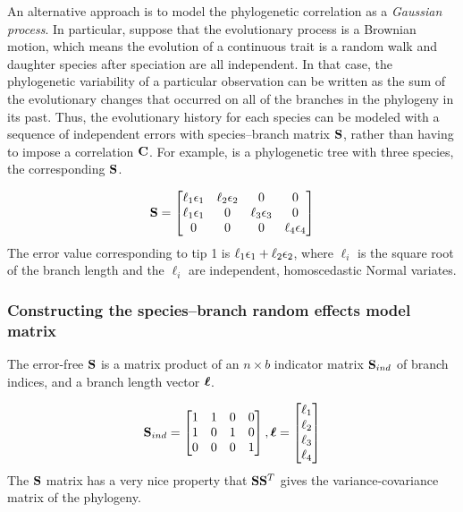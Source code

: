 An alternative approach is to model the phylogenetic correlation as a \textit{Gaussian process}. 
In particular, suppose that the evolutionary process is a Brownian motion, which means the evolution of a continuous trait is a random walk and daughter species after speciation are all independent.  
In that case, the phylogenetic variability of a particular observation can be written as the sum of the evolutionary changes that occurred on all of the branches in the phylogeny in its past. 
Thus, the evolutionary history for each species can be modeled with a sequence of independent errors with species--branch matrix ${\mathbf S}$, rather than having to impose a correlation ${\mathbf C}$.
For example,  is a phylogenetic tree with three species, the corresponding ${\mathbf S}$.

\begin{align*}
{\mathbf S} = \begin{bmatrix}
\ell_1 { \epsilon}_1 & \ell_2 { \epsilon}_2 & 0 & 0 \\
\ell_1 { \epsilon}_1 &  0 & \ell_3 { \epsilon}_3 & 0 \\
0  &  0 & 0  & \ell_4 { \epsilon}_4
\end{bmatrix}
\end{align*}
The error value corresponding to tip 1 is $\ell_1 { \epsilon}_1 + \ell_2 { \epsilon}_2$, where $\ell_i$ is the square root of the branch length and the $\ell_i$ are independent, homoscedastic Normal variates. 


\subsubsection*{Constructing the species--branch random effects model matrix}

The error-free ${\mathbf S}$ is a matrix product of an $n \times b$ indicator matrix ${\mathbf S}_{ind}$ of branch indices, and a branch length vector ${\boldsymbol \ell}$.

\begin{align*}
{\mathbf S}_{ind} = \begin{bmatrix}
1 & 1 & 0 & 0 \\ 
1 & 0 & 1 & 0 \\ 
0 & 0 & 0 & 1
\end{bmatrix} , 
{\boldsymbol \ell} = \begin{bmatrix}
\ell_1 \\
\ell_2 \\
\ell_3 \\
\ell_4 
\end{bmatrix}
\end{align*}
The ${\mathbf S}$ matrix has a very nice property that ${\mathbf S} {\mathbf S}^T$ gives the variance-covariance matrix of the phylogeny. 

